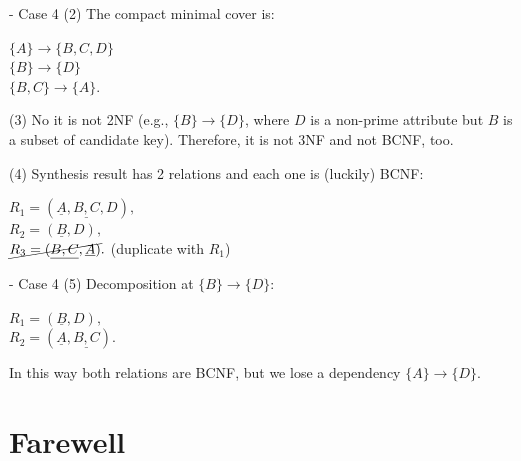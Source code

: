 \begin{frame}[fragile]{ - Case 4}
	(2) The compact minimal cover is:\\\vspace{5pt}
	
	$\{A\} \rightarrow \{B, C, D\}$\\
	$\{B\} \rightarrow \{D\}$\\
	$\{B, C\} \rightarrow \{A\}$.\\\vspace{5pt}
	
	(3) No it is not 2NF (e.g., $\{B\} \rightarrow \{D\}$, where $D$ is a non-prime attribute but $B$ is a subset of candidate key). Therefore, it is not 3NF and not BCNF, too.\\\vspace{5pt}
	
	(4) Synthesis result has 2 relations and each one is (luckily) BCNF: \\\vspace{5pt}
	
	$R_1 = (\underline{A}, \underline{B, C}, D),$\\\vspace{2pt}
	$R_2 = (\underline{B}, D),$\\\vspace{1pt}
	$\cancel{R_3 = (\underline{B, C}, \underline{A})}.$ (duplicate with $R_1$)\\\vspace{5pt}
	
\end{frame}

\begin{frame}[fragile]{ - Case 4}
	(5) Decomposition at $\{B\} \rightarrow \{D\}$:\\\vspace{5pt}
	
	$R_1 = (\underline{B}, D),$\\
	$R_2 = (\underline{A}, \underline{B, C}).$\\\vspace{5pt}
	
	In this way both relations are BCNF, but we lose a dependency $\{A\} \rightarrow \{D\}$.\\\vspace{5pt}
	
\end{frame}

\section*{Farewell}

